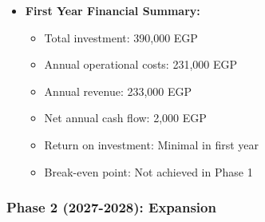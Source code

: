 \begin{itemize}
    \item \textbf{First Year Financial Summary:}
    \begin{itemize}
        \item Total investment: 390,000 EGP
        \item Annual operational costs: 231,000 EGP
        \item Annual revenue: 233,000 EGP
        \item Net annual cash flow: 2,000 EGP
        \item Return on investment: Minimal in first year
        \item Break-even point: Not achieved in Phase 1
    \end{itemize}
\end{itemize}

\subsubsection{Phase 2 (2027-2028): Expansion}
